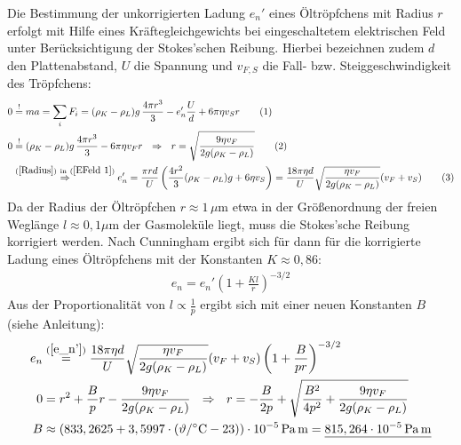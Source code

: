 \documentclass[a4paper,12pt]{article}
\newcommand\numberthis{\addtocounter{equation}{1}\tag{\theequation}}
\begin{document}
Die Bestimmung der unkorrigierten Ladung $e_n'$ eines Öltröpfchens mit Radius $r$ erfolgt mit Hilfe eines Kräftegleichgewichts bei eingeschaltetem elektrischen Feld unter Berücksichtigung der Stokes'schen Reibung. Hierbei bezeichnen zudem $d$ den Plattenabstand, $U$ die Spannung und $v_{F, S}$ die Fall- bzw. Steiggeschwindigkeit des Tröpfchens:
\begin{align*}
0&\overset {!}{=}ma=\sum_i F_i=(\rho_K-\rho_L)g\,\frac{4\pi r^3}{3}-e_n'\frac{U}{d}+6\pi\eta v_Sr\numberthis\label{EFeld 1}\\
0&\overset {!}{=}(\rho_K-\rho_L)g\,\frac{4\pi r^3}{3}-6\pi\eta v_Fr\ \ \Rightarrow\ \ r=\sqrt{\frac{9\eta v_F}{2 g(\rho_K-\rho_L)}}\numberthis\label{Radius}\\
&\overset {(\ref{Radius})\ \mathrm{in }\ (\ref{EFeld 1})}{\Rightarrow} e_n'=\frac{\pi r d}{U}\left(\frac{4r^2}{3}(\rho_K - \rho_L)g+6\eta v_S\right)=\frac{18\pi\eta d}{U}\sqrt{\frac{\eta v_F}{2g(\rho_K-\rho_L)}} (v_F+v_S)\numberthis\label{e_n'}
\end{align*}
Da der Radius der Öltröpfchen $r\approx 1\,\mu$m etwa in der Größenordnung der freien Weglänge $l\approx 0,1\mu$m der Gasmoleküle liegt, muss die Stokes'sche Reibung korrigiert werden. Nach Cunningham ergibt sich für dann für die korrigierte Ladung eines Öltröpfchens mit der Konstanten $K\approx 0,86$:
\begin{align*}
e_n=e_n'\left(1+\frac{Kl}{r}\right)^{-3/2}
\end{align*}
Aus der Proportionalität von $l\propto \frac{1}{p}$ ergibt sich mit einer neuen Konstanten $B$ (siehe Anleitung):
\begin{align*}
e_n&\overset {(\ref{e_n'})}{=}\frac{18\pi\eta d}{U}\sqrt{\frac{\eta v_F}{2g(\rho_K-\rho_L)}} (v_F+v_S)\left(1+\frac{B}{pr}\right)^{-3/2}\\
0&=r^2+\frac{B}{p}r-\frac{9\eta v_F}{2g(\rho_K-\rho_L)}\ \ \Rightarrow\ \ r=-\frac{B}{2p}+\sqrt{\frac{B^2}{4p^2}+\frac{9\eta v_F}{2g(\rho_K-\rho_L)}}\\
B&\approx \left(833,2625+3,5997\cdot (\vartheta /\degree\mathrm{C}-23)\right)\cdot 10^{-5}\,\mathrm{Pa}\,\mathrm{m}=\underline{815,264\cdot 10^{-5}\,\mathrm{Pa}\,\mathrm{m}}
\end{align*}
\end{document}
